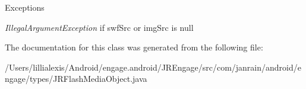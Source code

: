 \begin{DoxyExceptions}{Exceptions}
\item[{\em IllegalArgumentException}]if swfSrc or imgSrc is null \end{DoxyExceptions}


The documentation for this class was generated from the following file:\begin{DoxyCompactItemize}
\item 
/Users/lillialexis/Android/engage.android/JREngage/src/com/janrain/android/engage/types/JRFlashMediaObject.java\end{DoxyCompactItemize}
